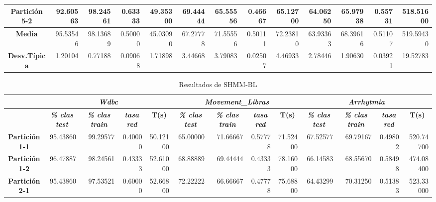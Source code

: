 \documentclass[a4paper,11pt]{article}
\begin{document}
\begin{table}[H]
\begin{adjustbox}{width=1.1\textwidth}
\begin{tabular}{|c|r|r|r|r|r|r|r|r|r|r|r|r|}
  \textbf{Partición 5-2} & 92.60563 & 98.24561 & 0.63333 & 49.35300 & 69.44444 & 65.55556 & 0.46667 & 65.12700 & 64.06250 & 65.97938 & 0.55731 & 518.51600 \\ \hline
  \textbf{Media} & 95.53546 & 98.13689 & 0.50000 & 45.03090 & 67.27778 & 71.55556 & 0.50111 & 72.23810 & 63.93363 & 68.39616 & 0.51107 & 519.59430 \\ \hline
  \textbf{Desv.Típica} & 1.20104 & 0.77188 & 0.09068 & 1.71898 & 3.44668 & 3.79083 & 0.02507 & 4.46933 & 2.78446 & 1.90630 & 0.03921 & 19.52783 \\ \hline
  \end{tabular}
  \end{adjustbox}
  \label{AGG}
  \end{table}
  
  \begin{table}[H]	
  \caption{Resultados de SHMM-BL}
  \begin{adjustbox}{width=1.1\textwidth}
  \begin{tabular}{|c|r|r|r|r|r|r|r|r|r|r|r|r|}
  \hline
  \multicolumn{1}{|l|}{} & \multicolumn{ 4}{c|}{\textbf{\textit{Wdbc}}} & \multicolumn{ 4}{c|}{\textbf{\textit{Movement\_Libras}}} & \multicolumn{ 4}{c|}{\textbf{\textit{Arrhytmia}}} \\ \hline
  \multicolumn{1}{|l|}{} & \multicolumn{1}{c|}{\textbf{\textit{\% clas test}}} & \multicolumn{1}{c|}{\textbf{\textit{\% clas train}}} & \multicolumn{1}{c|}{\textbf{\textit{tasa red}}} & \multicolumn{1}{c|}{\textbf{T(s)}} & \multicolumn{1}{c|}{\textbf{\textit{\% clas test}}} & \multicolumn{1}{c|}{\textbf{\textit{\% clas train}}} & \multicolumn{1}{c|}{\textbf{\textit{tasa red}}} & \multicolumn{1}{c|}{\textbf{T(s)}} & \multicolumn{1}{c|}{\textbf{\textit{\% clas test}}} & \multicolumn{1}{c|}{\textbf{\textit{\% clas train}}} & \multicolumn{1}{c|}{\textbf{\textit{tasa red}}} & \multicolumn{1}{c|}{\textbf{T(s)}} \\ \hline
  \textbf{Partición 1-1} & 95.43860 & 99.29577 & 0.40000 & 50.12100 & 65.00000 & 71.66667 & 0.57778 & 71.52400 & 67.52577 & 69.79167 & 0.49802 & 520.74700 \\ \hline
  \textbf{Partición 1-2} & 96.47887 & 98.24561 & 0.43333 & 52.61000 & 68.88889 & 69.44444 & 0.43333 & 78.16000 & 66.14583 & 68.55670 & 0.58498 & 474.08400 \\ \hline
  \textbf{Partición 2-1} & 95.43860 & 97.53521 & 0.60000 & 52.66800 & 72.22222 & 66.66667 & 0.47778 & 75.68800 & 64.43299 & 70.31250 & 0.51383 & 523.33000 \\ \hline

\end{tabular}
\end{adjustbox}
\end{table}
\end{document}
